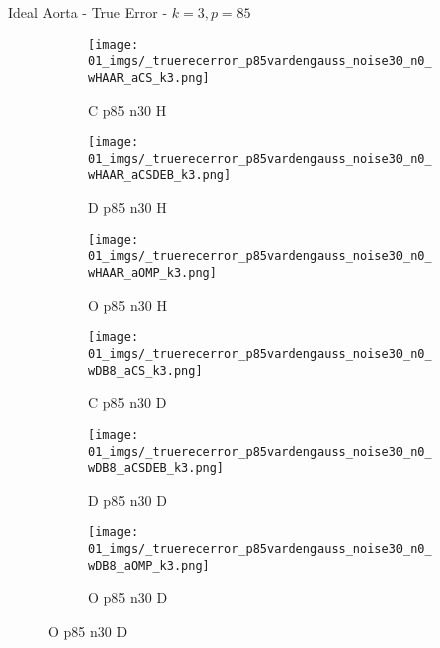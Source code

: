 \begin{frame}{Ideal Aorta - True Error - $k=3,p=85$}{}
\begin{figure}
\begin{subfigure}{0.13\textwidth}
\texttt{[image: 01\_imgs/\_truerecerror\_p85vardengauss\_noise30\_n0\_wHAAR\_aCS\_k3.png]}
\caption*{\tiny C p85 n30 H}
\end{subfigure}
\begin{subfigure}{0.13\textwidth}
\texttt{[image: 01\_imgs/\_truerecerror\_p85vardengauss\_noise30\_n0\_wHAAR\_aCSDEB\_k3.png]}
\caption*{\tiny D p85 n30 H}
\end{subfigure}
\begin{subfigure}{0.13\textwidth}
\texttt{[image: 01\_imgs/\_truerecerror\_p85vardengauss\_noise30\_n0\_wHAAR\_aOMP\_k3.png]}
\caption*{\tiny O p85 n30 H}
\end{subfigure}
\begin{subfigure}{0.13\textwidth}
\texttt{[image: 01\_imgs/\_truerecerror\_p85vardengauss\_noise30\_n0\_wDB8\_aCS\_k3.png]}
\caption*{\tiny C p85 n30 D}
\end{subfigure}
\begin{subfigure}{0.13\textwidth}
\texttt{[image: 01\_imgs/\_truerecerror\_p85vardengauss\_noise30\_n0\_wDB8\_aCSDEB\_k3.png]}
\caption*{\tiny D p85 n30 D}
\end{subfigure}
\begin{subfigure}{0.13\textwidth}
\texttt{[image: 01\_imgs/\_truerecerror\_p85vardengauss\_noise30\_n0\_wDB8\_aOMP\_k3.png]}
\caption*{\tiny O p85 n30 D}
\end{subfigure}
\end{figure}
\end{frame}

